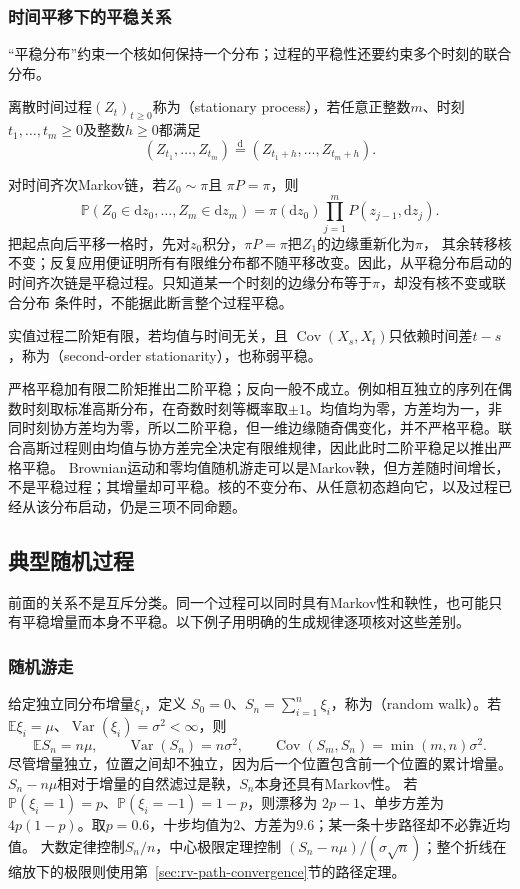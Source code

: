 \subsubsection{时间平移下的平稳关系}
\label{sec:rv-stationarity}
“平稳分布”约束一个核如何保持一个分布；过程的平稳性还要约束多个时刻的联合分布。
\begin{definition}[平稳过程]
  \label{def:stoch-stationary-process}
  离散时间过程\((Z_t)_{t\geq0}\)称为（stationary process），若任意正整数\(m\)、时刻\(t_1,\ldots,t_m\geq0\)及整数\(h\geq0\)都满足
  \[ (Z_{t_1},\ldots,Z_{t_m})\overset{\mathrm d}{=}(Z_{t_1+h},\ldots,Z_{t_m+h}). \]
\end{definition}
对时间齐次Markov链，若$Z_0\sim\pi$且
$\pi P=\pi$，则
\[
  \mathbb{P}(Z_0\in\mathrm{d}z_0,\ldots,Z_m\in\mathrm{d}z_m)
  =
  \pi(\mathrm{d}z_0)
  \prod_{j=1}^{m}P(z_{j-1},\mathrm{d}z_j).
\]
把起点向后平移一格时，先对$z_0$积分，$\pi P=\pi$把$Z_1$的边缘重新化为$\pi$，
其余转移核不变；反复应用便证明所有有限维分布都不随平移改变。因此，从平稳分布启动的
时间齐次链是平稳过程。只知道某一个时刻的边缘分布等于$\pi$，却没有核不变或联合分布
条件时，不能据此断言整个过程平稳。
\begin{definition}[二阶平稳]
\label{def:rv-second-order-stationary}
实值过程二阶矩有限，若均值与时间无关，且
\(\operatorname{Cov}(X_s,X_t)\)只依赖时间差\(t-s\)，称为（second-order stationarity），也称弱平稳。
\end{definition}
严格平稳加有限二阶矩推出二阶平稳；反向一般不成立。例如相互独立的序列在偶数时刻取标准高斯分布，在奇数时刻等概率取\(\pm1\)。均值均为零，方差均为一，非同时刻协方差均为零，所以二阶平稳，但一维边缘随奇偶变化，并不严格平稳。联合高斯过程则由均值与协方差完全决定有限维规律，因此此时二阶平稳足以推出严格平稳。
Brownian运动和零均值随机游走可以是Markov鞅，但方差随时间增长，不是平稳过程；其增量却可平稳。核的不变分布、从任意初态趋向它，以及过程已经从该分布启动，仍是三项不同命题。

\subsection{典型随机过程}
前面的关系不是互斥分类。同一个过程可以同时具有Markov性和鞅性，也可能只有平稳增量而本身不平稳。以下例子用明确的生成规律逐项核对这些差别。

\subsubsection{随机游走}
\label{sec:rv-random-walk}
给定独立同分布增量\(\xi_i\)，定义
\(S_0=0\)、\(S_n=\sum_{i=1}^n\xi_i\)，称为（random walk）。若
\(\mathbb E\xi_i=\mu\)、\(\operatorname{Var}(\xi_i)=\sigma^2<\infty\)，则
\[
\mathbb ES_n=n\mu,\qquad
\operatorname{Var}(S_n)=n\sigma^2,\qquad
\operatorname{Cov}(S_m,S_n)=\min(m,n)\sigma^2.
\]
尽管增量独立，位置之间却不独立，因为后一个位置包含前一个位置的累计增量。
\(S_n-n\mu\)相对于增量的自然滤过是鞅，\(S_n\)本身还具有Markov性。
若\(\mathbb P(\xi_i=1)=p\)、\(\mathbb P(\xi_i=-1)=1-p\)，则漂移为
\(2p-1\)、单步方差为\(4p(1-p)\)。取\(p=0.6\)，十步均值为\(2\)、方差为\(9.6\)；某一条十步路径却不必靠近均值。
大数定律控制\(S_n/n\)，中心极限定理控制
\((S_n-n\mu)/(\sigma\sqrt n)\)；整个折线在缩放下的极限则使用第~\ref{sec:rv-path-convergence}节的路径定理。

